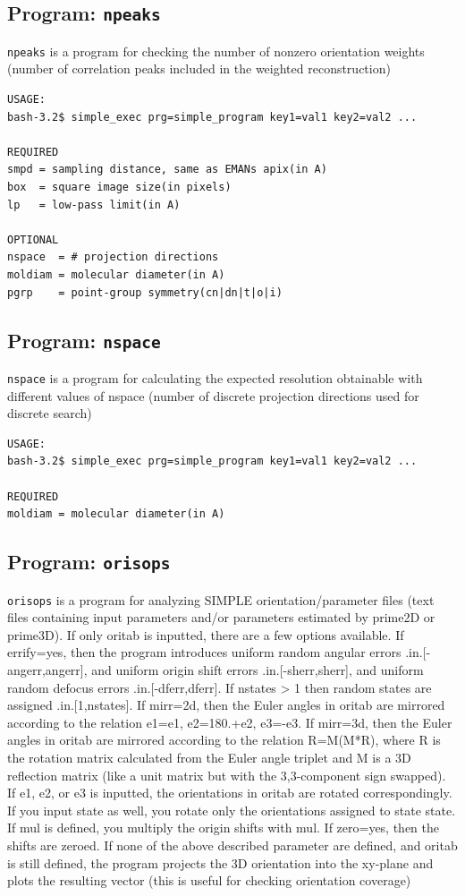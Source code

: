 \documentclass[a4paper,11pt]{article}
\newcommand{\prgname}[1]{\textcolor{NavyBlue}{\texttt{#1}}}
\begin{document}
\subsection{Program: \prgname{npeaks}}
\label{npeaks}
\prgname{npeaks} is a program for checking the number of nonzero orientation weights (number of correlation peaks included in the weighted reconstruction)

\begin{verbatim}
USAGE:
bash-3.2$ simple_exec prg=simple_program key1=val1 key2=val2 ...

REQUIRED
smpd = sampling distance, same as EMANs apix(in A)
box  = square image size(in pixels)
lp   = low-pass limit(in A)

OPTIONAL
nspace  = # projection directions
moldiam = molecular diameter(in A)
pgrp    = point-group symmetry(cn|dn|t|o|i)
\end{verbatim}

\subsection{Program: \prgname{nspace}}
\label{nspace}
\prgname{nspace} is a program for calculating the expected resolution obtainable with different values of nspace (number of discrete projection directions used for discrete search)

\begin{verbatim}
USAGE:
bash-3.2$ simple_exec prg=simple_program key1=val1 key2=val2 ...

REQUIRED
moldiam = molecular diameter(in A)
\end{verbatim}

\subsection{Program: \prgname{orisops}}
\label{orisops}
\prgname{orisops} is a program for analyzing SIMPLE orientation/parameter files (text files containing input parameters and/or parameters estimated by prime2D or prime3D). If only oritab is inputted, there are a few options available. If errify=yes, then the program introduces uniform random angular errors .in.[-angerr,angerr], and uniform origin shift errors .in.[-sherr,sherr], and uniform random defocus errors .in.[-dferr,dferr]. If nstates > 1 then random states are assigned .in.[1,nstates]. If mirr=2d, then the Euler angles in oritab are mirrored according to the relation e1=e1, e2=180.+e2, e3=-e3. If mirr=3d, then the Euler angles in oritab are mirrored according to the relation R=M(M*R), where R is the rotation matrix calculated from the Euler angle triplet and M is a 3D reflection matrix (like a unit matrix but with the 3,3-component sign swapped). If e1, e2, or e3 is inputted, the orientations in oritab are rotated correspondingly. If you input state as well, you rotate only the orientations assigned to state state. If mul is defined, you multiply the origin shifts with mul. If zero=yes, then the shifts are zeroed. If none of the above described parameter are defined, and oritab is still defined, the program projects the 3D orientation into the xy-plane and plots the resulting vector (this is useful for checking orientation coverage)
\end{document}
